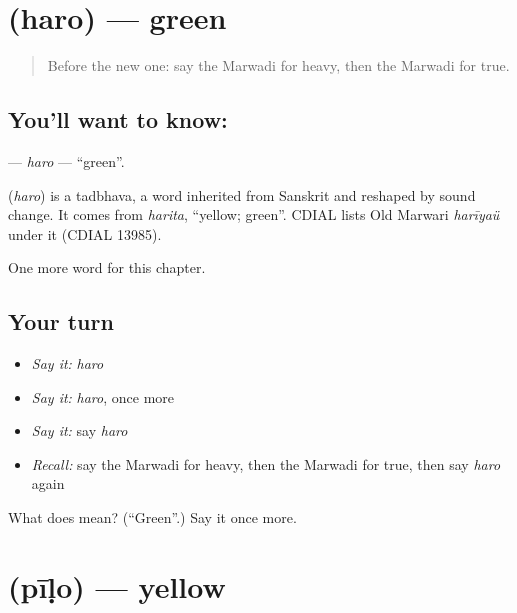 \section[\texorpdfstring{\mw{हरो} (haro)}{हरो (haro)}]{ (haro) — green}

\label{lesson:MW-C76-haro}



\begin{quote}
Before the new one: say the Marwadi for heavy, then the Marwadi for true.
\end{quote}

\subsection*{You'll want to know: }
\textbf{} — \emph{haro} — \textquotedblleft{}green\textquotedblright{}.

\begin{cousinweb}
\textbf{} (\emph{haro}) is a tadbhava, a word inherited from Sanskrit and reshaped by sound change. It comes from \emph{harita}, \textquotedblleft{}yellow; green\textquotedblright{}. CDIAL lists Old Marwari \emph{harīyaü} under it (CDIAL 13985).
\end{cousinweb}

\begin{grammarlens}[title={What you've built}]
One more word for this chapter.
\end{grammarlens}

\subsection*{Your turn}
\begin{itemize}
\raggedright
  \item \emph{Say it:} \emph{haro}
  \item \emph{Say it:} \emph{haro}, once more
  \item \emph{Say it:} say \emph{haro}
  \item \emph{Recall:} say the Marwadi for heavy, then the Marwadi for true, then say \emph{haro} again
\end{itemize}

\begin{tcolorbox}[breakable,colback=teal!4,colframe=teal!35!black,title={Before you move on}]
What does  mean? (\textquotedblleft{}Green\textquotedblright{}.) Say it once more.
\end{tcolorbox}
\section[\texorpdfstring{\mw{पीळो} (pīḷo)}{पीळो (pīḷo)}]{ (pīḷo) — yellow}

